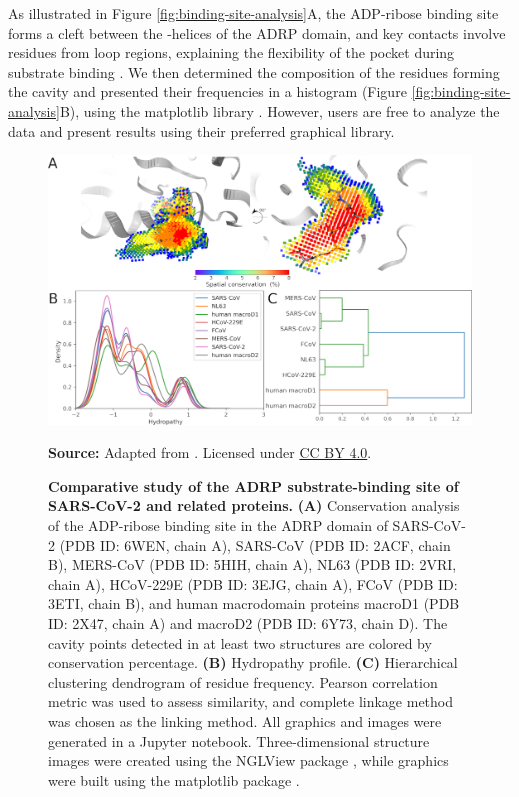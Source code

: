 \documentclass[Ingles]{phdthesis}
\begin{document}
As illustrated in Figure \ref{fig:binding-site-analysis}A, the ADP-ribose binding site forms a cleft between the \textalpha-helices of the \acs{ADRP} domain, and key contacts involve residues from loop regions, explaining the flexibility of the pocket during substrate binding \cite{michalska2020}. We then determined the composition of the residues forming the cavity and presented their frequencies in a histogram (Figure \ref{fig:binding-site-analysis}B), using the matplotlib library \cite{matplotlib}. However, users are free to analyze the data and present results using their preferred graphical library.

\begin{figure}[h]
  \centering
  \includegraphics[scale=1.5]{images/adrp-sars-cov-2-conservation-analysis.png}
  \centerline{\tiny{\textbf{Source:} Adapted from \cite{guerra2021}. Licensed under \href{https://creativecommons.org/licenses/by/4.0/}{CC BY 4.0}.}}
  \caption[Comparative study of the ADRP substrate-binding site of SARS-CoV-2 and related proteins]{\textbf{Comparative study of the ADRP substrate-binding site of SARS-CoV-2 and related proteins.} \textbf{(A)} Conservation analysis of the ADP-ribose binding site in the ADRP domain of SARS-CoV-2 (PDB ID: 6WEN, chain A), SARS-CoV (PDB ID: 2ACF, chain B), MERS-CoV (PDB ID: 5HIH, chain A), NL63 (PDB ID: 2VRI, chain A), HCoV-229E (PDB ID: 3EJG, chain A), FCoV (PDB ID: 3ETI, chain B), and human macrodomain proteins macroD1 (PDB ID: 2X47, chain A) and macroD2 (PDB ID: 6Y73, chain D). The cavity points detected in at least two structures are colored by conservation percentage. \textbf{(B)} Hydropathy profile. \textbf{(C)} Hierarchical clustering dendrogram of residue frequency. Pearson correlation metric was used to assess similarity, and complete linkage method was chosen as the linking method. All graphics and images were generated in a Jupyter notebook. Three-dimensional structure images were created using the NGLView package \cite{nglview}, while graphics were built using the matplotlib package \cite{matplotlib}.}
  \label{fig:conservation-analysis}
\end{figure}
\end{document}
